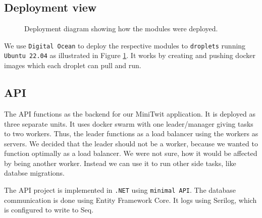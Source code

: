 \subsection{Deployment view}

\begin{figure}[H]
      \centering
      \caption{Deployment diagram showing how the modules were deployed.}
      \label{fig:deployment_diagram}
\end{figure}

We use \texttt{Digital Ocean} to deploy the respective modules to \texttt{droplets} running \texttt{Ubuntu 22.04} as illustrated in Figure \ref{fig:deployment_diagram}. It works by creating and pushing docker images which each droplet can pull and run.

\subsection{API}

The API functions as the backend for our MiniTwit application.
It is deployed as three separate units. 
It uses docker swarm with one leader/manager 
giving tasks to two workers. Thus, the leader functions as a 
load balancer using the workers as servers.
We decided that the leader should not be a worker,
because we wanted to function optimally as a load balancer.
We were not sure, how it would be affected by being another worker.
Instead we can use it to run other side tasks, like databse migrations.

The API project is implemented in \texttt{.NET} using \texttt{minimal API}\cite{minimalApi}.
The database communication is done using Entity Framework Core.
It logs using Serilog\cite{serilog}, 
which is configured to write to Seq\cite{seq}.

